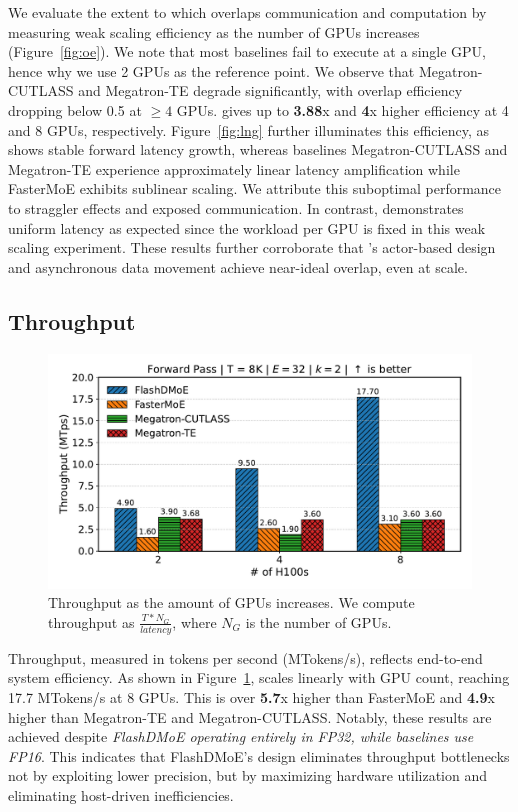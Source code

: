 We evaluate the extent to which \sysname overlaps communication and computation by measuring weak scaling efficiency
as the number of GPUs increases (Figure~\ref{fig:oe}).
We note that most baselines fail to execute at a single GPU, hence why we use 2 GPUs as the reference point.
We observe that Megatron-CUTLASS and Megatron-TE degrade significantly,
with overlap efficiency dropping below 0.5 at $\geq 4$ GPUs. \sysname gives up to \textbf{3.88}x and
\textbf{4}x higher efficiency at 4 and 8 GPUs, respectively.
Figure~\ref{fig:lng} further illuminates this efficiency, as \sysname shows stable forward latency growth,
whereas baselines Megatron-CUTLASS and Megatron-TE experience approximately linear
latency amplification while FasterMoE exhibits sublinear scaling.
We attribute this suboptimal performance to straggler effects and exposed communication.
In contrast, \sysname demonstrates uniform latency as expected since the workload per
GPU is fixed in this weak scaling experiment.
These results further corroborate that \sysname's actor-based design and asynchronous data movement
achieve near-ideal overlap, even at scale.
\subsection{Throughput}\label{subsec:throughput}
\begin{figure}[!ht]
    \centering
    \centering
    \includegraphics[width=0.7\linewidth, keepaspectratio]{figures/throughput_8}
    \caption{Throughput as the amount of GPUs increases. We compute throughput as $\frac{T * N_G}{latency}$, where
        $N_G$ is the number of GPUs.}
    \label{fig:thr}
\end{figure}
Throughput, measured in tokens per second (MTokens/s), reflects end-to-end system efficiency.
As shown in Figure~\ref{fig:thr}, \sysname
scales linearly with GPU count,
reaching 17.7 MTokens/s at 8 GPUs.
This is over \textbf{5.7}x higher than FasterMoE and \textbf{4.9}x higher than Megatron-TE and Megatron-CUTLASS\@.
Notably, these results are achieved despite \emph{FlashDMoE operating entirely in FP32,
while baselines use FP16}.
This indicates that FlashDMoE’s design eliminates throughput bottlenecks not by
exploiting lower precision, but by maximizing hardware utilization and eliminating host-driven inefficiencies.

